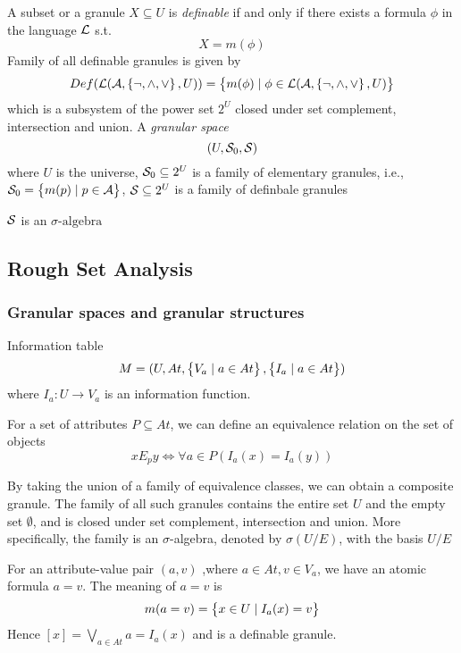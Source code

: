 \documentclass[11pt]{article}
\begin{document}
A subset or a granule \(X\subseteq U\) is \emph{definable} if and only if there
exists a formula \(\phi\) in the language \(\mathcal{L}\) s.t.
\begin{equation*}
X=m(\phi)
\end{equation*}
Family of all definable granules is given by
\begin{equation*}
Def(\mathcal{L}(\mathcal{A},\left\{\neg,\wedge,\vee\right\},U))=\left\{ m(\phi)\mid\phi\in\mathcal{L}
(\mathcal{A},\left\{\neg,\wedge,\vee\right\},U)\right\}
\end{equation*}
which is a subsystem of the power set \(2^U\) closed under set complement,
intersection and union. A \emph{granular space}
\begin{equation*}
(U,\mathcal{S}_0,\mathcal{S})
\end{equation*}
where \(U\) is the universe, \(\mathcal{S}_0\subseteq 2^U\) is a family of elementary
granules, i.e., \(\mathcal{S}_0=\left\{ m(p)\mid p\in\mathcal{A}\right\}\), \(\mathcal{S}\subseteq 2^U\) is
a family of definbale granules

\(\mathcal{S}\) is an \(\sigma\text{-algebra}\)
\subsection{Rough Set Analysis}
\label{sec:orgbbaeec6}
\subsubsection{Granular spaces and granular structures}
\label{sec:orgd9a723b}
Information table
\begin{equation*}
M=(U,At,\left\{ V_a\mid a\in At\right\},\left\{ I_a\mid a\in At\right\})
\end{equation*}
where \(I_a:U\to V_a\) is an information function.

For a set of attributes \(P\subseteq At\), we can define an equivalence
relation on the set of objects
\begin{equation*}
xE_py\Longleftrightarrow\forall a\in P(I_a(x)=I_a(y))
\end{equation*}

By taking the union of a family of equivalence classes, we can obtain a
composite granule. The family of all such granules contains the entire set \(U\)
and the empty set \(\emptyset\), and is closed under set complement,
intersection and 
union. More specifically, the family is an \(\sigma\)-algebra, denoted by \(\sigma(U/E)\),
with the basis \(U/E\)

For an attribute-value pair \((a,v)\) ,where \(a\in At, v\in V_a\), we have an
atomic formula \(a=v\). The meaning of \(a=v\) is
\begin{equation*}
m(a=v)=\left\{ x\in U\mid I_a(x)=v\right\}
\end{equation*}
Hence \([x]=\bigvee_{a\in At}a=I_a(x)\) and is a definable granule.
\end{document}
